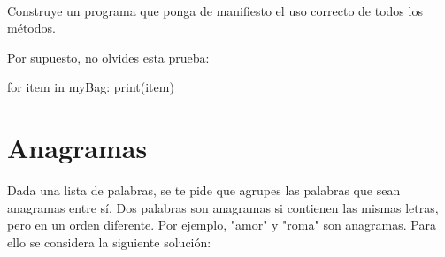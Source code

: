\

Construye un programa que ponga de manifiesto el uso correcto de todos los métodos. 

Por supuesto, no olvides esta prueba:
\begin{minipage}{.22\textwidth}
\begin{pyverbatim}[][frame=single]
for item in myBag:
    print(item)
\end{pyverbatim}
\end{minipage}



 
\separacion
\section{Anagramas} \label{sec:anagramas}

Dada una lista de palabras, se te pide que agrupes las palabras que sean anagramas entre sí. Dos palabras son anagramas si contienen las mismas letras, pero en un orden diferente. Por ejemplo, "amor" y "roma" son anagramas. Para ello se considera la siguiente solución:

